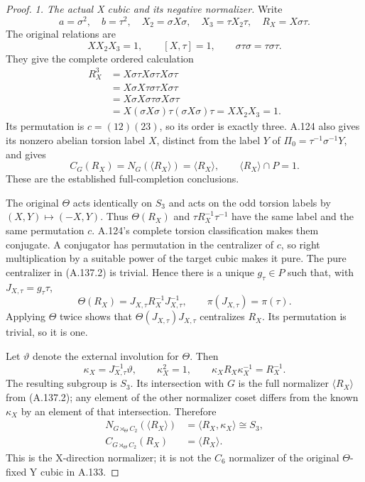 \begin{proof}
\emph{1. The actual X cubic and its negative normalizer.}
Write
\[
 a=\sigma^2,\quad b=\tau^2,\quad
 X_2=\sigma X\sigma,\quad X_3=\tau X_2\tau,\quad
 R_X=X\sigma\tau .
\]
The original relations are
\[
 XX_2X_3=1,\qquad [X,\tau]=1,\qquad
 \sigma\tau\sigma=\tau\sigma\tau.
\]
They give the complete ordered calculation
\[
\begin{aligned}
 R_X^3
 &=X\sigma\tau X\sigma\tau X\sigma\tau\\
 &=X\sigma X\tau\sigma\tau X\sigma\tau\\
 &=X\sigma X\sigma\tau\sigma X\sigma\tau\\
 &=X(\sigma X\sigma)\tau(\sigma X\sigma)\tau
   =XX_2X_3=1 .
\end{aligned}
\tag{A.137.1}
\]
Its permutation is \(c=(12)(23)\), so its order is exactly three.
A.124 also gives its nonzero abelian torsion label \(X\), distinct
from the label \(Y\) of \(\Pi_0=\tau^{-1}\sigma^{-1}Y\), and gives
\[
 C_G(R_X)=N_G(\langle R_X\rangle)=\langle R_X\rangle,
 \qquad \langle R_X\rangle\cap P=1.
\tag{A.137.2}
\]
These are the established full-completion conclusions.

The original \(\Theta\) acts identically on \(S_3\) and acts on
the odd torsion labels by \((X,Y)\mapsto(-X,Y)\).
Thus \(\Theta(R_X)\) and \(\tau R_X^{-1}\tau^{-1}\) have the
same label and the same permutation \(c\). A.124's complete
torsion classification makes them conjugate. A conjugator has
permutation in the centralizer of \(c\), so right multiplication
by a suitable power of the target cubic makes it pure.
The pure centralizer in (A.137.2) is trivial. Hence there is a
unique \(g_\tau\in P\) such that, with \(J_{X,\tau}=g_\tau\tau\),
\[
 \Theta(R_X)=J_{X,\tau}R_X^{-1}J_{X,\tau}^{-1},
 \qquad \pi(J_{X,\tau})=\pi(\tau).
\tag{A.137.3}
\]
Applying \(\Theta\) twice shows that
\(\Theta(J_{X,\tau})J_{X,\tau}\) centralizes \(R_X\).
Its permutation is trivial, so it is one.

Let \(\vartheta\) denote the external involution for \(\Theta\).
Then
\[
 \kappa_X=J_{X,\tau}^{-1}\vartheta,\qquad
 \kappa_X^2=1,\qquad
 \kappa_XR_X\kappa_X^{-1}=R_X^{-1}.
\]
The resulting subgroup is \(S_3\). Its intersection with \(G\)
is the full normalizer \(\langle R_X\rangle\) from (A.137.2);
any element of the other normalizer coset differs from the
known \(\kappa_X\) by an element of that intersection. Therefore
\[
\begin{aligned}
 N_{G\rtimes_\Theta C_2}(\langle R_X\rangle)
   &=\langle R_X,\kappa_X\rangle\cong S_3,\\
 C_{G\rtimes_\Theta C_2}(R_X)&=\langle R_X\rangle .
\end{aligned}
\tag{A.137.4}
\]
This is the X-direction normalizer; it is not the \(C_6\)
normalizer of the original \(\Theta\)-fixed Y cubic in A.133.


\end{proof}
